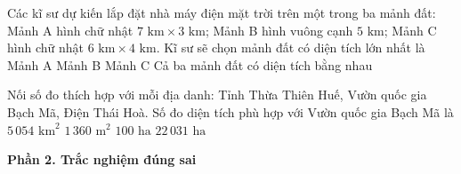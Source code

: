 \begin{ex} %
Các kĩ sư dự kiến lắp đặt nhà máy điện mặt trời trên một trong ba mảnh đất: Mảnh A hình chữ nhật $7\text{ km} \times 3\text{ km}$; Mảnh B hình vuông cạnh $5\text{ km}$; Mảnh C hình chữ nhật $6\text{ km} \times 4\text{ km}$. Kĩ sư sẽ chọn mảnh đất có diện tích lớn nhất là
\choice
{Mảnh A}
{\True Mảnh B}
{Mảnh C}
{Cả ba mảnh đất có diện tích bằng nhau}
\end{ex}

\begin{ex} %
Nối số đo thích hợp với mỗi địa danh: Tỉnh Thừa Thiên Huế, Vườn quốc gia Bạch Mã, Điện Thái Hoà. Số đo diện tích phù hợp với Vườn quốc gia Bạch Mã là
\choice
{$5\,054\text{ km}^2$}
{$1\,360\text{ m}^2$}
{$100\text{ ha}$}
{\True $22\,031\text{ ha}$}
\end{ex}

\textbf{Phần 2. Trắc nghiệm đúng sai}

